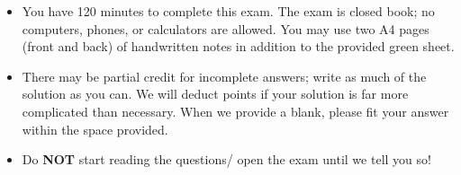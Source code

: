 \documentclass[addpoints, 12pt]{exam}
\begin{document}
\begin{center}
\begin{itemize}
\item You have 120 minutes to complete this exam. The exam is closed book; no computers, phones, or calculators are allowed. You may use two A4 pages (front and back) of handwritten notes in addition to the provided green sheet.
\item There may be partial credit for incomplete answers; write as much of the solution as you can. We will deduct points if your solution is far more complicated than necessary. When we provide a blank, please fit your answer within the space provided.
\item Do \textbf{NOT} start reading the questions/ open the exam until we tell you so!
\end{itemize}



\end{center}
\end{document}
